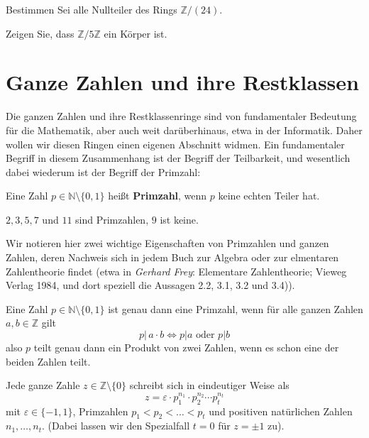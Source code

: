 \begin{aufgabe} Bestimmen Sei alle Nullteiler des Rings $\mathbb Z/ (24)$. \end{aufgabe}

\begin{aufgabe} Zeigen Sie, dass $\mathbb Z/ 5 \mathbb Z$ ein Körper ist.
\end{aufgabe}


\newpage

\section{Ganze Zahlen und ihre Restklassen}\label{section_ganze_zahl}

\setcounter{definition}{0}
\setcounter{beispiel}{0}
\setcounter{notiz}{0}


Die ganzen Zahlen und ihre Restklassenringe sind von fundamentaler Bedeutung für die Mathematik, aber 
auch weit darüberhinaus, etwa in der Informatik. Daher wollen wir diesen Ringen einen eigenen Abschnitt 
widmen. Ein fundamentaler Begriff in diesem Zusammenhang ist der Begriff der Teilbarkeit, und wesentlich 
dabei wiederum ist der Begriff der Primzahl:

\begin{definition} Eine Zahl $p \in \mathbb N \setminus \{0, 1\}$ heißt \textbf{Primzahl}, 
wenn $p$ keine echten Teiler hat.
\end{definition}

\begin{beispiel} $2, 3, 5, 7$ und $11$ sind Primzahlen, $9$ ist keine.
\end{beispiel}

Wir notieren hier zwei wichtige Eigenschaften von Primzahlen und ganzen Zahlen, deren Nachweis sich 
in jedem Buch zur Algebra oder zur elmentaren Zahlentheorie findet (etwa in \textit{Gerhard Frey}: 
Elementare Zahlentheorie; Vieweg Verlag 1984, und dort speziell die Aussagen 2.2,  3.1, 3.2 und 3.4)).

\begin{notiz} Eine Zahl $p \in \mathbb N \setminus \{0, 1\}$ ist genau dann eine Primzahl, wenn 
für alle ganzen Zahlen $a, b \in \mathbb Z$ gilt
  	$$ p \vert \, a \cdot b \iff p \vert a \textrm{ oder } p \vert b $$
also $p$ teilt genau dann ein Produkt von zwei Zahlen, wenn es schon eine der beiden Zahlen teilt.
\end{notiz}

\begin{notiz}\label{gruppe_primfaktorzerlegung_eindeutig} Jede ganze Zahle $z \in \mathbb Z 
\setminus \{ 0 \}$ schreibt sich in eindeutiger Weise als
  	$$ z = \varepsilon \cdot p_1^{n_1} \cdot p_2^{n_2} \cdots p_t^{n_t} $$
mit $\varepsilon \in \{-1,1\}$, Primzahlen $p_1 < p_2 < \ldots < p_t$ und positiven natürlichen Zahlen 
$n_1, \ldots , n_t$. (Dabei lassen wir den Spezialfall $t = 0$ für $z = \pm 1$ zu).
\end{notiz}

